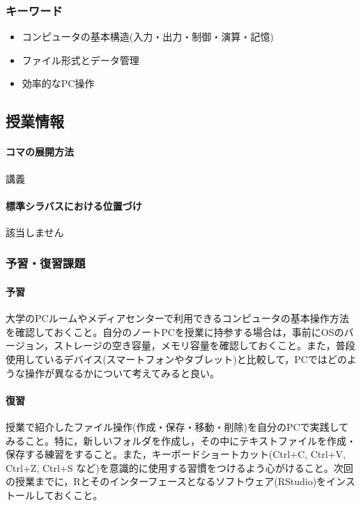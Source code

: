 \subsubsection{キーワード}
\begin{itemize}
	\item コンピュータの基本構造(入力・出力・制御・演算・記憶)
	\item ファイル形式とデータ管理
	\item 効率的なPC操作
\end{itemize}
\subsection{授業情報}
\paragraph{コマの展開方法}
講義
\paragraph{標準シラバスにおける位置づけ}
該当しません
\subsubsection{予習・復習課題}
\paragraph{予習}
大学のPCルームやメディアセンターで利用できるコンピュータの基本操作方法を確認しておくこと。自分のノートPCを授業に持参する場合は，事前にOSのバージョン，ストレージの空き容量，メモリ容量を確認しておくこと。また，普段使用しているデバイス(スマートフォンやタブレット)と比較して，PCではどのような操作が異なるかについて考えてみると良い。
\paragraph{復習}
授業で紹介したファイル操作(作成・保存・移動・削除)を自分のPCで実践してみること。特に，新しいフォルダを作成し，その中にテキストファイルを作成・保存する練習をすること。また，キーボードショートカット(Ctrl+C, Ctrl+V, Ctrl+Z, Ctrl+S など)を意識的に使用する習慣をつけるよう心がけること。次回の授業までに，Rとそのインターフェースとなるソフトウェア(RStudio)をインストールしておくこと。
